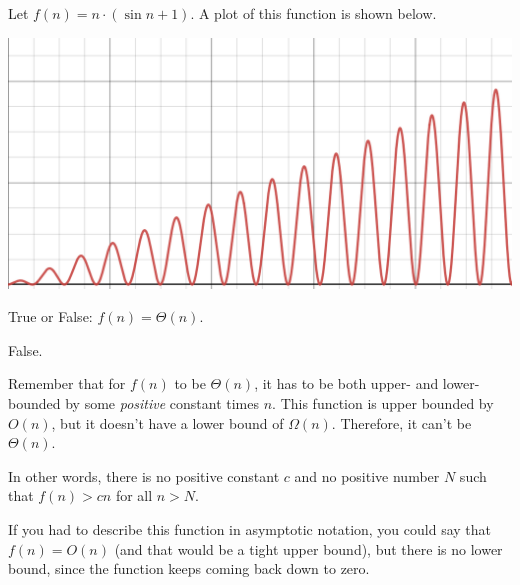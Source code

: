 \begin{prob}

    Let $f(n) = n \cdot (\sin{n} + 1 )$. A plot of this function is shown below.

    \includegraphics{./plot.png}

    True or False: $f(n) = \Theta(n)$.

    \tF{}

    \begin{soln}
        False.

        Remember that for $f(n)$ to be $\Theta(n)$, it has to be both upper- and lower-bounded
        by some \textit{positive} constant times $n$.
        This function is upper bounded by $O(n)$, but it doesn't have a lower bound
        of $\Omega(n)$. Therefore, it can't be $\Theta(n)$.

        In other words, there is no positive constant $c$ and no positive
        number $N$ such that $f(n) > c n$ for all $n > N$.

        If you had to describe this function in asymptotic notation, you could
        say that $f(n) = O(n)$ (and that would be a tight upper bound), but there
        is no lower bound, since the function keeps coming back down to zero.
    \end{soln}

\end{prob}
